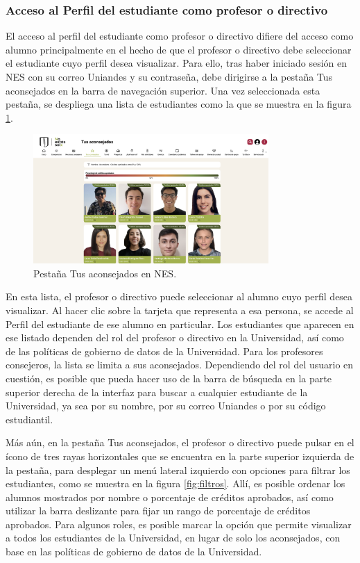 \subsubsection{Acceso al Perfil del estudiante como profesor o directivo}
 
El acceso al perfil del estudiante como profesor o directivo difiere del acceso como alumno principalmente en el hecho de que el profesor o directivo debe seleccionar el estudiante cuyo perfil desea visualizar. Para ello, tras haber iniciado sesión en \gls{NES} con su correo Uniandes y su contraseña, debe dirigirse a la pestaña Tus aconsejados en la barra de navegación superior. Una vez seleccionada esta pestaña, se despliega una lista de estudiantes como la que se muestra en la figura \ref{fig:tus_aconsejados}.

\begin{figure}[H]
  \centering
  \includegraphics[width=0.8\textwidth]{img/nes/tus_aconsejados.png}
  \caption{Pestaña Tus aconsejados en NES.}
  \label{fig:tus_aconsejados}
\end{figure}

En esta lista, el profesor o directivo puede seleccionar al alumno cuyo perfil desea visualizar. Al hacer clic sobre la tarjeta que representa a esa persona, se accede al Perfil del estudiante de ese alumno en particular. Los estudiantes que aparecen en ese listado dependen del rol del profesor o directivo en la Universidad, así como de las políticas de gobierno de datos de la Universidad. Para los profesores consejeros, la lista se limita a sus aconsejados. Dependiendo del rol del usuario en cuestión, es posible que pueda hacer uso de la barra de búsqueda en la parte superior derecha de la interfaz para buscar a cualquier estudiante de la Universidad, ya sea por su nombre, por su correo Uniandes o por su código estudiantil.

Más aún, en la pestaña Tus aconsejados, el profesor o directivo puede pulsar en el ícono de tres rayas horizontales que se encuentra en la parte superior izquierda de la pestaña, para desplegar un menú lateral izquierdo con opciones para filtrar los estudiantes, como se muestra en la figura \ref{fig:filtros}. Allí, es posible ordenar los alumnos mostrados por nombre o porcentaje de créditos aprobados, así como utilizar la barra deslizante para fijar un rango de porcentaje de créditos aprobados. Para algunos roles, es posible marcar la opción que permite visualizar a todos los estudiantes de la Universidad, en lugar de solo los aconsejados, con base en las políticas de gobierno de datos de la Universidad.

